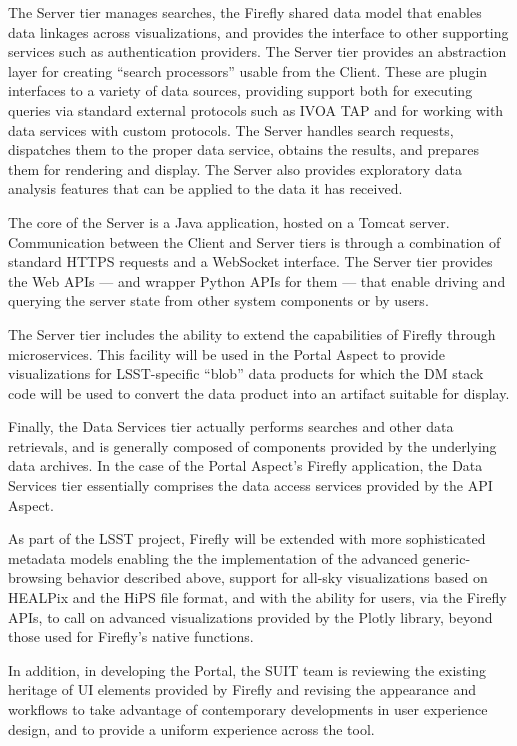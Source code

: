 The Server tier manages searches, the Firefly shared data model that enables data linkages across visualizations, and provides the interface to other supporting services such as authentication providers.
The Server tier provides an abstraction layer for creating ``search processors'' usable from the Client.
These are plugin interfaces to a variety of data sources, providing support both for executing queries via standard external protocols such as IVOA TAP and for working with data services with custom protocols.
The Server handles search requests, dispatches them to the proper data service, obtains the results, 
and prepares them for rendering and display.
The Server also provides exploratory data analysis features that can be applied to the data it has received.

The core of the Server is a Java application, hosted on a Tomcat server.
Communication between the Client and Server tiers is through a combination of standard HTTPS requests and a WebSocket interface.
The Server tier provides the Web APIs --- and wrapper Python APIs for them --- that enable driving and querying the server state from other system components or by users.

The Server tier includes the ability to extend the capabilities of Firefly through microservices.
This facility will be used in the Portal Aspect to provide visualizations for LSST-specific ``blob'' data products for which the DM stack code will be used to convert the data product into an artifact suitable for display.

Finally, the Data Services tier actually performs searches and other data retrievals, and is generally composed of components provided by the underlying data archives.
In the case of the Portal Aspect's Firefly application, the Data Services tier essentially comprises the data access services provided by the API Aspect.

As part of the LSST project, Firefly will be extended with more sophisticated metadata models enabling the the implementation of the advanced generic-browsing behavior described above, support for all-sky visualizations based on HEALPix and the HiPS file format, and with the ability for users, via the Firefly APIs, to call on advanced visualizations provided by the Plotly library, beyond those used for Firefly's native functions.

In addition, in developing the Portal, the SUIT team is reviewing the existing heritage of UI elements provided by Firefly and revising the appearance and workflows to take advantage of contemporary developments in user experience design, and to provide a uniform experience across the tool.

